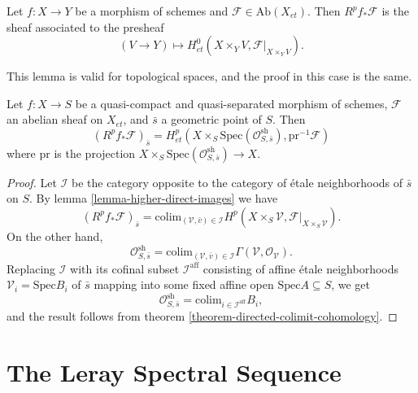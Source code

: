 \begin{lemma}
\label{lemma-higher-direct-images}
Let $f: X\to Y$ be a morphism of schemes and $\mathcal{F}\in
\text{Ab}(X_{et})$. Then $R^pf_*\mathcal{F}$ is the sheaf associated to the
presheaf
$$
(V\to Y)\longmapsto H_{et}^0 \left(X\times_Y V,
\mathcal{F}|_{X\times_YV}\right).
$$
\end{lemma}

\noindent
This lemma is valid for topological spaces, and the proof in this case is the
same.

\begin{theorem}
\label{theorem-higher-direct-images}
Let $f: X\to S$ be a quasi-compact and quasi-separated morphism of schemes,
$\mathcal{F}$ an abelian sheaf on $X_{et}$, and $\bar s$ a geometric point of
$S$. Then
$$
\left(R^pf_* \mathcal{F}\right)_{\bar s} = H_{et}^p\left( X\times_S
\text{Spec}(\mathcal{O}_{S, \bar s}^\mathrm{sh}),
\text{pr}^{-1}\mathcal{F}\right)
$$
where $\text{pr}$ is the projection $X\times_S \text{Spec}(\mathcal{O}_{S,
\bar{s}}^\mathrm{sh}) \to X$.
\end{theorem}

\begin{proof}
Let $\mathcal{I}$ be the category opposite to the category of \'etale
neighborhoods of $\bar s$ on $S$. By lemma \ref{lemma-higher-direct-images}
we have
$$
\left(R^pf_*\mathcal{F}\right)_{\bar{s}} = \text{colim}_{(\mathcal{V},
\bar{v})\in \mathcal{I}} H^p(X\times_S\mathcal{V},
\mathcal{F}|_{X\times_S\mathcal{V}}).
$$
On the other hand,
$$
\mathcal{O}_{S, \bar{s}}^\mathrm{sh} = \text{colim}_{(\mathcal{V}, \bar v)\in
\mathcal{I}} \Gamma(\mathcal{V}, \mathcal{O}_\mathcal{V}).
$$
Replacing $\mathcal{I}$ with its cofinal subset $\mathcal{I}^\mathrm{aff}$
consisting of affine \'etale neighborhoods $\mathcal{V}_i= \text{Spec} B_i$ of
$\bar s$ mapping into some fixed affine open $\text{Spec} A \subseteq S$, we get
$$
\mathcal{O}_{S, \bar{s}}^\mathrm{sh} = \text{colim}_{i\in
\mathcal{I}^\mathrm{aff}} B_i,
$$
and the result follows from theorem \ref{theorem-directed-colimit-cohomology}.
\end{proof}





\section{The Leray Spectral Sequence}
\label{section-leray}

